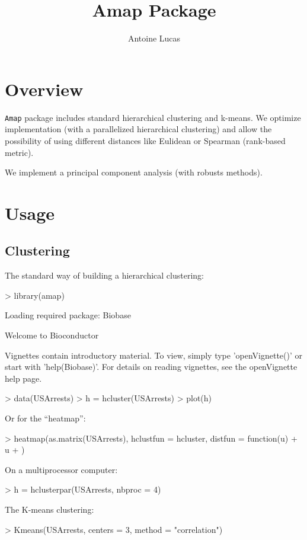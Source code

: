 \documentclass[a4paper]{article}
\title{Amap Package}
\author{Antoine Lucas}
\begin{document}
\maketitle

\tableofcontents

\section{Overview}

{\tt Amap} package includes standard hierarchical  
clustering and k-means. We optimize implementation 
(with a parallelized hierarchical clustering) and
allow the possibility of using different distances like
Eulidean or Spearman (rank-based metric).

We implement a principal component analysis (with robusts methods).

\section{Usage}

\subsection{Clustering}

The standard way of building  a hierarchical clustering:
\begin{Schunk}
\begin{Sinput}
> library(amap)
\end{Sinput}
\begin{Soutput}
Loading required package: Biobase

Welcome to Bioconductor 

	Vignettes contain introductory material.
	To view, simply type 'openVignette()' or start with 'help(Biobase)'. 
	For details on reading vignettes, see the openVignette help page.
\end{Soutput}
\begin{Sinput}
> data(USArrests)
> h = hcluster(USArrests)
> plot(h)
\end{Sinput}
\end{Schunk}
 Or for the ``heatmap'':
\begin{Schunk}
\begin{Sinput}
> heatmap(as.matrix(USArrests), hclustfun = hcluster, distfun = function(u) {
+     u
+ })
\end{Sinput}
\end{Schunk}
On a multiprocessor computer:
\begin{Schunk}
\begin{Sinput}
> h = hclusterpar(USArrests, nbproc = 4)
\end{Sinput}
\end{Schunk}
The K-means clustering:
\begin{Schunk}
\begin{Sinput}
> Kmeans(USArrests, centers = 3, method = "correlation")
\end{Sinput}
\end{Schunk}
\end{document}

